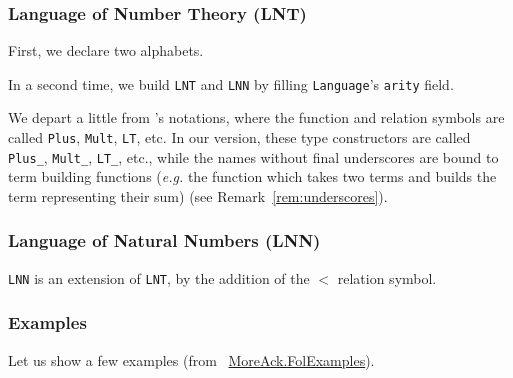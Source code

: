\subsubsection{Language of Number Theory (LNT)}

First, we declare two alphabets.


In a second time, we build \texttt{LNT} and \texttt{LNN} by filling \texttt{Language}'s \texttt{arity} field.


\begin{remark}
  We depart a little from \cite{Goedel}'s notations, where the 
function and relation symbols are called \texttt{Plus}, 
\texttt{Mult}, \texttt{LT}, etc. In our version, these type constructors are called \texttt{Plus\_}, 
\texttt{Mult\_}, \texttt{LT\_}, etc., while the names without final underscores are bound to term building functions (\emph{e.g.}
the function which takes two terms and builds the term representing their sum) (see Remark~\ref{rem:underscores}).
\end{remark}


\subsubsection{Language of Natural Numbers (LNN)}

\texttt{LNN} is an extension of \texttt{LNT}, by the addition 
of the $<$ relation symbol.





\subsubsection{Examples}

Let us show a few examples (from ~\href{../theories/html/hydras.MoreAck.FolExamples.html}{MoreAck.FolExamples}).

 





